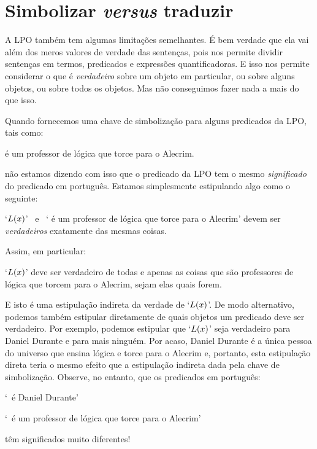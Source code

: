 \section{Simbolizar \emph{versus} traduzir}
A LPO também tem algumas limitações semelhantes.
É bem verdade que ela vai além dos meros valores de verdade das sentenças, pois nos permite dividir sentenças em termos, predicados e expressões quantificadoras.
E isso nos permite considerar o que é \emph{verdadeiro} sobre um objeto em particular, ou sobre alguns objetos, ou sobre todos os objetos.
Mas não conseguimos fazer nada a mais do que isso.

Quando fornecemos uma chave de simbolização para alguns predicados da LPO, tais como:
	\begin{ekey}
		\item[\atom{L}{x}]  é um professor de lógica que torce para o Alecrim.
	\end{ekey} 
não estamos dizendo com isso que o predicado da LPO tem o mesmo  \emph{significado} do predicado em português.
Estamos simplesmente estipulando algo como o seguinte:
	\begin{ebullet}
		\item `$\mathord{L}(x)$' \ e \ `  é um professor de lógica que torce para o Alecrim' devem ser \emph{verdadeiros} exatamente das mesmas coisas.
	\end{ebullet}
Assim, em particular:
	\begin{ebullet}
		\item `$\mathord{L}(x)$' deve ser verdadeiro de todas e apenas as coisas que são professores de lógica que torcem para o Alecrim, sejam elas quais forem.
	\end{ebullet}
E isto é uma estipulação indireta da verdade de `$\mathord{L}(x)$'.
De modo alternativo, podemos também estipular diretamente de quais objetos um predicado deve ser verdadeiro.
Por exemplo, podemos estipular que `$\mathord{L}(x)$' seja verdadeiro para Daniel Durante e para mais ninguém.
Por acaso, Daniel Durante é a única pessoa do universo que ensina lógica e torce para o Alecrim e, portanto, esta estipulação direta teria o mesmo efeito que a estipulação indireta dada pela chave de simbolização.
Observe, no entanto, que os predicados em português:
\begin{earg}
	\item[] `\blank\ é Daniel Durante'
	\item[] `\blank\ é um professor de lógica que torce para o Alecrim'
\end{earg}
têm significados muito diferentes!

